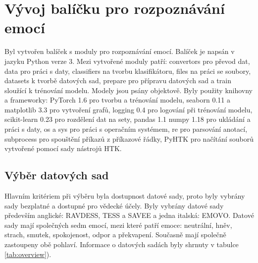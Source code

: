 \documentclass[FM,BP]{tulthesis}
\begin{document}
\chapter{Vývoj balíčku pro rozpoznávání emocí} %
Byl vytvořen balíček s moduly pro rozpoznávání emocí. Balíček je napsán v jazyku Python verze 3. Mezi vytvořené moduly patří: convertors pro převod dat, data pro práci s daty, classifiers na tvorbu klasifikátoru, files na práci se soubory, datasets k tvorbě datových sad, prepare pro přípravu datových sad a train sloužící k trénování modelu. Modely jsou psány objektově. Byly použity knihovny a frameworky: PyTorch 1.6 pro tvorbu a trénování modelu, seaborn 0.11 a matplotlib 3.3 pro vytvoření grafů, logging 0.4 pro logování při trénování modelu, scikit-learn 0.23 pro rozdělení dat na sety, pandas 1.1 numpy 1.18 pro ukládání a práci s daty, os a sys pro práci s operačním systémem, re pro parsování anotací, subprocess pro spouštění příkazů z příkazové řádky, PyHTK pro načítání souborů vytvořené pomocí sady nástrojů HTK.

\section{Výběr datových sad} %
Hlavním kritériem při výběru byla dostupnost datové sady, proto byly vybrány sady bezplatné a dostupné pro vědecké účely. Byly vybrány datové sady především anglické: RAVDESS, TESS a SAVEE a jedna italská: EMOVO. Datové sady mají společných sedm emocí, mezi které patří emoce: neutrální, hněv, strach, smutek, spokojenost, odpor a překvapení. Současně mají společně zastoupeny obě pohlaví. Informace o datových sadách byly shrnuty v tabulce \ref{tab:overview}).

\begin{table}[ht]
\centering
{}
\caption{Přehled vybraných datových sad}
\label{tab:overview}
\end{table}
\FloatBarrier
\end{document}
